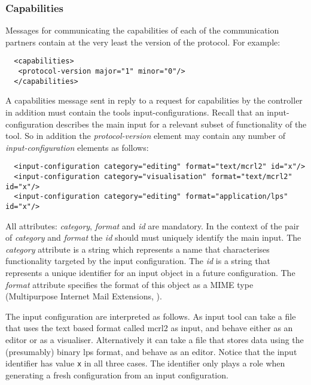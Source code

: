 \documentclass{article}
\begin{document}
  \subsubsection{Capabilities}

   Messages for communicating the capabilities of each of the communication
   partners contain at the very least the version of the protocol. For example:

   \small \begin{verbatim}
  <capabilities>
   <protocol-version major="1" minor="0"/>
  </capabilities>\end{verbatim} \normalsize

   \noindent A capabilities message sent in reply to a request for capabilities by the
   controller in addition must contain the tools input-configurations. Recall
   that an input-configuration describes the main input for a relevant subset
   of functionality of the tool. So in addition the \textit{protocol-version}
   element may contain any number of \textit{input-configuration} elements as
   follows:

   \small \begin{verbatim}
  <input-configuration category="editing" format="text/mcrl2" id="x"/>
  <input-configuration category="visualisation" format="text/mcrl2" id="x"/>
  <input-configuration category="editing" format="application/lps" id="x"/>\end{verbatim}
\normalsize
   \noindent All attributes: \textit{category}, \textit{format} and \textit{id} are
   mandatory. In the context of the pair of \textit{category} and
   \textit{format} the \textit{id} should must uniquely identify the main
   input. The \textit{category} attribute is a string which represents a name
   that characterises functionality targeted by the input configuration. The
   \textit{id} is a string that represents a unique identifier for an input
   object in a future configuration. The \textit{format} attribute specifies
   the format of this object as a MIME type (Multipurpose Internet Mail
   Extensions, \cite{rfc2822}).

   The input configuration are interpreted as follows. As input tool can take a
   file that uses the text based format called mcrl2 as input, and behave
   either as an editor or as a visualiser. Alternatively it can take a file
   that stores data using the (presumably) binary lps format, and behave as an
   editor. Notice that the input identifier has value \verb'x' in all three
   cases.  The identifier only plays a role when generating a fresh
   configuration from an input configuration.
\end{document}
